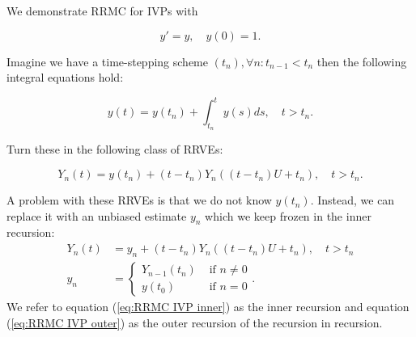 \documentclass[a4paper,12pt]{article}
\begin{document}
\begin{example}[RRMC $y'=y$] \label{ex:RRMC IVP}
    We demonstrate RRMC for IVPs with

    \begin{equation}
        y' = y, \quad y(0) = 1.
    \end{equation}

    Imagine we have a time-stepping scheme $(t_{n}), \forall n: t_{n-1} < t_{n}$
    then the following integral equations hold:

    \begin{equation}
        y(t)= y(t_{n}) + \int_{t_{n}}^{t}y(s)ds , \quad t>t_{n}.
    \end{equation}

    Turn these in the following class of RRVEs:

    \begin{equation}
        Y_{n}(t) = y(t_{n}) + (t-t_{n})Y_{n}((t-t_{n})U+t_{n}), \quad t>t_{n}.
    \end{equation}

    A problem with these RRVEs is that we do not know $y(t_{n})$.
    Instead, we can replace it with an unbiased estimate $y_{n}$
    which we keep frozen in the inner recursion:
    \begin{align}
        \label{eq:RRMC IVP inner}
        Y_{n}(t) & = y_{n} + (t-t_{n})Y_{n}((t-t_{n})U+t_{n}), \quad t>t_{n} \\
        y_{n}    & = \begin{cases}
                         Y_{n-1}(t_{n}) & \text{ if } n \neq 0 \\
                         y(t_{0})       & \text{ if } n = 0
                     \end{cases}.
        \label{eq:RRMC IVP outer}
    \end{align}
    We refer to equation (\ref{eq:RRMC IVP inner}) as the inner recursion and
    equation (\ref{eq:RRMC IVP outer}) as the outer recursion of the recursion in
    recursion.
\end{example}
\end{document}
